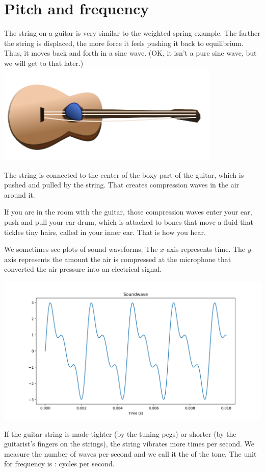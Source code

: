 \section{Pitch and frequency}

The string on a guitar is very similar to the weighted spring
example. The farther the string is displaced, the more force it feels
pushing it back to equilibrium. Thus, it moves back and forth in a
sine wave. (OK, it isn't a pure sine wave, but we will get to that later.)
\includegraphics[width=0.8\textwidth]{guitar.png}

The string is connected to the center of the boxy part of the guitar,
which is pushed and pulled by the string. That creates compression
waves in the air around it.

If you are in the room with the guitar, those compression waves enter
your ear, push and pull your ear drum, which is attached to bones that
move a fluid that tickles tiny hairs, called  in your
inner ear. That is how you hear.

We sometimes see plots of sound waveforms.  The $x$-axis represents
time. The $y$-axis represents the amount the air is compressed at the
microphone that converted the air pressure into an electrical signal.

\includegraphics[width=0.8\linewidth]{soundwave.png}

If the guitar string is made tighter (by the tuning pegs) or shorter
(by the guitarist's fingers on the strings), the string vibrates more
times per second.  We measure the number of waves per second and we
call it the  of the tone. The unit for frequency is
: cycles per second.

